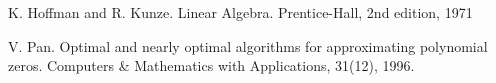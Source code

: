 \documentclass{article}
\begin{document}
\begin{thebibliography}{9}
K. Hoffman and R. Kunze. Linear Algebra. Prentice-Hall, 2nd edition, 1971

V. Pan. Optimal and nearly optimal algorithms for approximating polynomial zeros. Computers & Mathematics with Applications, 31(12), 1996.

\end{thebibliography}
\end{document}
